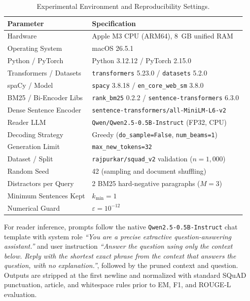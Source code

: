\documentclass[conference]{IEEEtran}
\begin{document}
\begin{table}[h]
\centering
\caption{Experimental Environment and Reproducibility Settings.}
\label{tab:repro}
\begin{tabular}{@{}ll@{}}
\toprule
Parameter & Specification \\
\midrule
Hardware & Apple M3 CPU (ARM64), 8~GB unified RAM \\
Operating System & macOS 26.5.1 \\
Python / PyTorch & Python 3.12.12 / PyTorch 2.15.0 \\
Transformers / Datasets & \texttt{transformers} 5.23.0 / \texttt{datasets} 5.2.0 \\
spaCy / Model & \texttt{spacy} 3.8.18 / \texttt{en\_core\_web\_sm} 3.8.0 \\
BM25 / Bi-Encoder Libs & \texttt{rank\_bm25} 0.2.2 / \texttt{sentence-transformers} 6.3.0 \\
Dense Sentence Encoder & \texttt{sentence-transformers/all-MiniLM-L6-v2} \\
Reader LLM & \texttt{Qwen/Qwen2.5-0.5B-Instruct} (FP32, CPU) \\
Decoding Strategy & Greedy (\texttt{do\_sample=False}, \texttt{num\_beams=1}) \\
Generation Limit & \texttt{max\_new\_tokens=32} \\
Dataset / Split & \texttt{rajpurkar/squad\_v2} validation ($n=1,000$) \\
Random Seed & 42 (sampling and document shuffling) \\
Distractors per Query & 2 BM25 hard-negative paragraphs ($M=3$) \\
Minimum Sentences Kept & $k_{\min} = 1$ \\
Numerical Guard & $\varepsilon = 10^{-12}$ \\
\bottomrule
\end{tabular}
\end{table}

For reader inference, prompts follow the native \texttt{Qwen2.5-0.5B-Instruct} chat template with system role \emph{``You are a precise extractive question-answering assistant.''} and user instruction \emph{``Answer the question using only the context below. Reply with the shortest exact phrase from the context that answers the question, with no explanation.''}, followed by the pruned context and question. Outputs are stripped at the first newline and normalized with standard SQuAD punctuation, article, and whitespace rules prior to EM, F1, and ROUGE-L evaluation.
\end{document}
